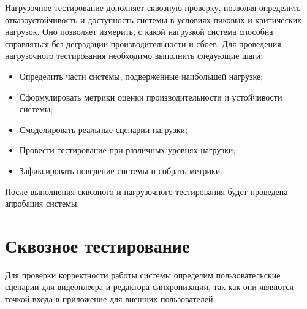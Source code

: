 	Нагрузочное тестирование дополняет сквозную проверку, позволяя определить отказоустойчивость и доступность системы в условиях пиковых и критических нагрузок. Оно позволяет измерить, с какой нагрузкой система способна справляться без деградации производительности и сбоев. Для проведения нагрузочного тестирования необходимо выполнить следующие шаги:

	\begin{itemize}[label=$\bullet$]
		\item Определить части системы, подверженные наибольшей нагрузке;
		\item Сформулировать метрики оценки производительности и устойчивости системы;
		\item Смоделировать реальные сценарии нагрузки;
		\item Провести тестирование при различных уровнях нагрузки;
		\item Зафиксировать поведение системы и собрать метрики.
	\end{itemize}

	После выполнения сквозного и нагрузочного тестирования будет проведена апробация системы.

\section{Сквозное тестирование}

	Для проверки корректности работы системы определим пользовательские сценарии для видеоплеера и редактора синхронизации, так как они являются точкой входа в приложение для внешних пользователей.

